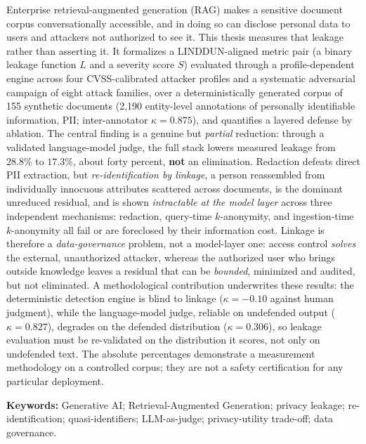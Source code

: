\documentclass[12pt,a4paper]{report}
\begin{document}
\noindent Enterprise retrieval-augmented generation (RAG) makes a sensitive document
corpus conversationally accessible, and in doing so can disclose personal data to users and
attackers not authorized to see it. This thesis measures that leakage rather than asserting
it. It formalizes a LINDDUN-aligned metric pair (a binary leakage function $L$ and a
severity score $S$) evaluated through a profile-dependent engine across four CVSS-calibrated
attacker profiles and a systematic adversarial campaign of eight attack families, over a
deterministically generated corpus of 155 synthetic documents (2{,}190 entity-level
annotations of personally identifiable information, PII; inter-annotator $\kappa = 0.875$), and quantifies a layered defense by ablation.
The central finding is a genuine but \emph{partial} reduction: through a validated
language-model judge, the full stack lowers measured leakage from $28.8\%$ to $17.3\%$,
about forty percent, \textbf{not} an elimination. Redaction defeats direct PII extraction, but
\emph{re-identification by linkage}, a person reassembled from individually innocuous
attributes scattered across documents, is the dominant unreduced residual, and is shown
\emph{intractable at the model layer} across three independent mechanisms: redaction,
query-time $k$-anonymity, and ingestion-time $k$-anonymity all fail or are foreclosed by their
information cost. Linkage is therefore a \emph{data-governance} problem, not a model-layer one:
access control \emph{solves} the external, unauthorized attacker, whereas the authorized user
who brings outside knowledge leaves a residual that can be \emph{bounded}, minimized and
audited, but not eliminated. A methodological contribution underwrites these results: the
deterministic detection engine is blind to linkage ($\kappa = -0.10$ against human judgment),
while the language-model judge, reliable on undefended output ($\kappa = 0.827$), degrades on
the defended distribution ($\kappa = 0.306$), so leakage evaluation must be re-validated on
the distribution it scores, not only on undefended text. The absolute percentages demonstrate
a measurement methodology on a controlled corpus; they are not a safety certification for any
particular deployment.

\medskip
\noindent\textbf{Keywords:} Generative AI; Retrieval-Augmented Generation; privacy leakage;
re-identification; quasi-identifiers; LLM-as-judge; privacy-utility trade-off; data governance.

\end{document}
